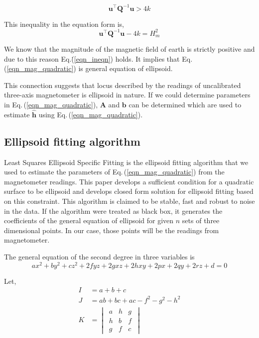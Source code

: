 \documentclass[10pt, a4paper]{article}
\begin{document}
\begin{equation} \label{eqn_ineqn}
\bm{u}^{\intercal}\bm{Q}^{-1}\bm{u} > 4k
\end{equation}

This inequality in the equation form is,
\begin{equation}
\bm{u}^{\intercal}\bm{Q}^{-1}\bm{u} - 4k = H_m^2
\end{equation}

We know that the magnitude of the magnetic field of earth is strictly positive and due to this reason Eq.\.(\ref{eqn_ineqn}) holds. It implies that Eq.\,(\ref{eqn_mag_quadratic}) is general equation of ellipsoid. 

This connection suggests that locus described by the readings of uncalibrated three-axis magnetometer is ellipsoid in nature. If we could determine parameters in Eq.\,(\ref{eqn_mag_quadratic}), $\bm{A}$ and $\bm{b}$ can be determined which are used to estimate $\bm{\hat{h}}$ using Eq.\,(\ref{eqn_mag_quadratic}).

\subsection{Ellipsoid fitting algorithm}
Least Squares Ellipsoid Specific Fitting is the ellipsoid fitting algorithm that we used to estimate the parameters of Eq.\,(\ref{eqn_mag_quadratic}) from the magnetometer readings. This paper develops a sufficient condition for a quadratic surface to be ellipsoid and develops closed form solution for ellipsoid fitting based on this constraint. This algorithm is claimed to be stable, fast and robust to noise in the data. If the algorithm were treated as black box, it generates the  coefficients of the general equation of ellipsoid for given $n$ sets of three dimensional points. In our case, those points will be the readings from magnetometer. 

The general equation of the second degree in three variables is
\begin{equation} \label{eqn_general_quadric}
ax^{2} + by^{2} + cz^{2} + 2fyz + 2 gxz + 2hxy + 2px + 2qy + 2rz + d = 0
\end{equation}

Let,
\begin{equation}
\begin{split}
I &= a + b + c \\
J &= ab + bc + ac - f^{2} - g^{2} - h^{2} \\
K &= \begin{vmatrix} \,a&h&g\,\\\,h&b&f\,\\\,g&f&c\,\end{vmatrix} 
\end{split}
\end{equation}
\end{document}
